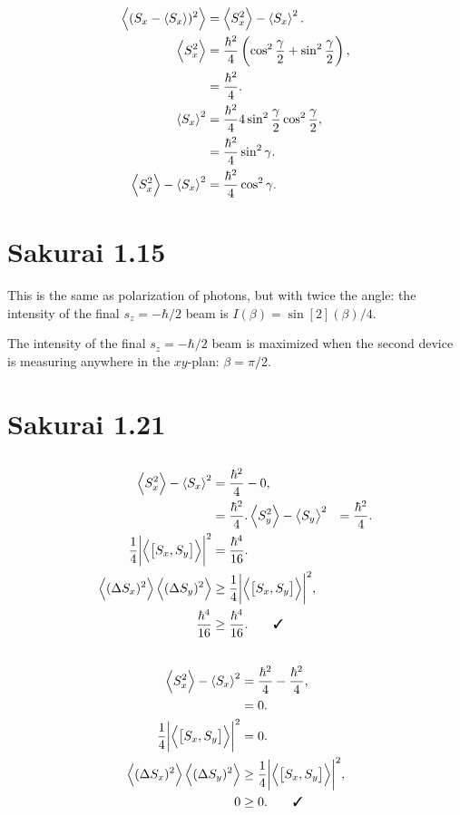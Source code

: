 \documentclass[
a4paper,
10pt,
twoside,
]{article}
\begin{document}
\subsection{} %
\begin{align}
	\ev{(S_x-\ev{S_x})^2} &= \ev{S_x^2} - \ev{S_x}^2.\\
	\ev{S_x^2} &= \frac{\hbar^2}{4} \left(\cos^2\frac{\gamma}{2} + \sin^2 \frac{\gamma}{2}\right),\\
	&= \frac{\hbar^2}{4}.\\
	\ev{S_x}^2 &= \frac{\hbar^2}{4} 4\sin^2\frac{\gamma}{2}\cos^2\frac{\gamma}{2},\\
	&= \frac{\hbar^2}{4} \sin^2 \gamma.\\
	\ev{S_x^2} - \ev{S_x}^2 &= \frac{\hbar^2}{4} \cos^2 \gamma.
\end{align}

\section{Sakurai 1.15}
This is the same as polarization of photons, but with twice the angle:
the intensity of the final $s_z = -\hbar/2$ beam is $I(\beta) = \sin[2](\beta)/4$.

The intensity of the final $s_z = -\hbar/2$ beam is maximized when the second device is measuring anywhere in the $xy$-plan: $\beta = \pi/2$.

\section{Sakurai 1.21}
\subsection{} %
\begin{align}
	\ev{S_x^2} - \ev{S_x}^2 &= \frac{\hbar^2}{4} - 0,\\
	&= \frac{\hbar^2}{4}.
	\ev{S_y^2} - \ev{S_y}^2 &= \frac{\hbar^2}{4}.\\
	\frac{1}{4} \abs{\ev{\commutator{S_x}{S_y}}}^2 &= \frac{\hbar^4}{16}.\\
	\ev{(\Delta S_x)^2}\ev{(\Delta S_y)^2} &\geq \frac{1}{4} \abs{\ev{\commutator{S_x}{S_y}}}^2,\\
	\frac{\hbar^4}{16} &\geq \frac{\hbar^4}{16}. \qquad \cmark
\end{align}
\subsection{} %
\begin{align}
	\ev{S_x^2} - \ev{S_x}^2 &= \frac{\hbar^2}{4} - \frac{\hbar^2}{4},\\
	&= 0.\\
	\frac{1}{4} \abs{\ev{\commutator{S_x}{S_y}}}^2 &= 0.\\
	\ev{(\Delta S_x)^2}\ev{(\Delta S_y)^2} &\geq \frac{1}{4} \abs{\ev{\commutator{S_x}{S_y}}}^2,\\
	0 &\geq 0. \qquad \cmark
\end{align}
\end{document}
